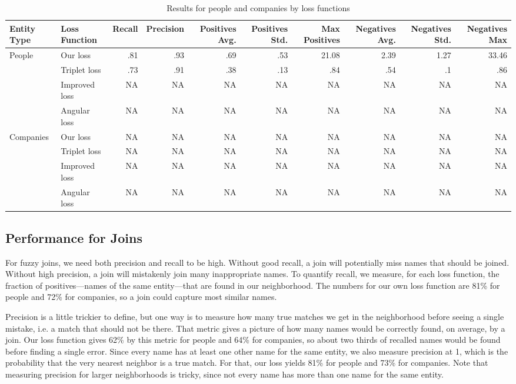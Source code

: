 \begin{table*}[ht]
\caption{Results for people and companies by loss functions}
\label{Evaluation}
\begin{tabular}{l|l|r|r|r|r|r|r|r|r|}
\hline
Entity Type & Loss Function & Recall & Precision & Positives Avg. & Positives Std. & Max Positives & Negatives Avg. & Negatives Std. & Negatives Max \\
\hline
\multirow{4}{*}{People} & Our loss & .81 & .93 & .69 & .53 & 21.08 & 2.39 & 1.27 & 33.46 \\
\hline
& Triplet loss & .73 & .91 & .38 & .13 & .84 & .54 & .1 & .86 \\
\hline
& Improved loss & NA & NA & NA & NA & NA & NA & NA & NA \\
\hline
& Angular loss & NA & NA & NA & NA & NA & NA & NA & NA \\
\hline
\multirow{4}{*}{Companies} & Our loss & NA & NA & NA & NA & NA & NA & NA & NA \\
& Triplet loss & NA & NA & NA & NA & NA & NA & NA & NA \\
\hline
& Improved loss & NA & NA & NA & NA & NA & NA & NA & NA \\
\hline
& Angular loss & NA & NA & NA & NA & NA & NA & NA & NA \\
\hline
\end{tabular}
\end{table*}

\subsection{Performance for Joins}

 For fuzzy joins, we need both precision and recall to be high.  Without good recall, a join will potentially miss names that should be joined.  Without high precision, a join will mistakenly join many inappropriate names.  To quantify recall, we measure, for each loss function, the fraction of positives---names of the same entity---that are found in our neighborhood.  The numbers for our own loss function are 81\% for people and 72\% for companies, so a join could capture most similar names.

 Precision is a little trickier to define, but one way is to measure how many true matches we get in the neighborhood before seeing a single mistake, i.e. a match that should not be there.  That metric gives a picture of how many names would be correctly found, on average, by a join.  Our loss function gives 62\% by this metric for people and 64\% for companies, so about two thirds of recalled names would be found before finding a single error.  Since every name has at least one other name for the same entity, we also measure precision at 1, which is the probability that the very nearest neighbor is a true match.  For that, our loss yields 81\% for people and 73\% for companies.  Note that measuring precision for larger neighborhoods is tricky, since not every name has more than one name for the same entity.

